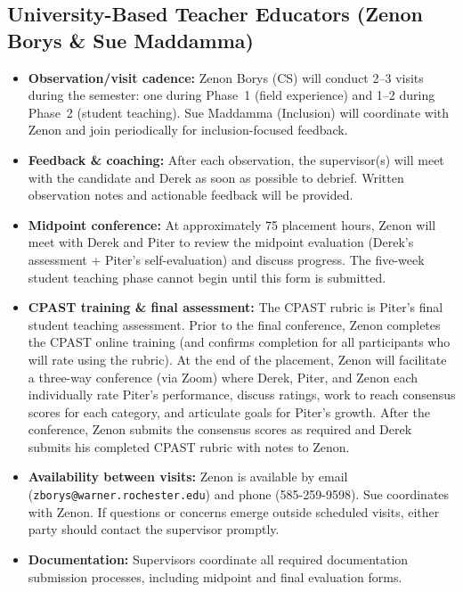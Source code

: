 \documentclass[10pt]{article}
\begin{document}
\subsection{University-Based Teacher Educators (Zenon Borys \& Sue Maddamma)}

\begin{itemize}[leftmargin=*,itemsep=0.25em]
  \item \textbf{Observation/visit cadence:} Zenon Borys (CS) will conduct 2--3 visits during the semester: one during Phase~1 (field experience) and 1--2 during Phase~2 (student teaching). Sue Maddamma (Inclusion) will coordinate with Zenon and join periodically for inclusion-focused feedback.
  \item \textbf{Feedback \& coaching:} After each observation, the supervisor(s) will meet with the candidate and Derek as soon as possible to debrief. Written observation notes and actionable feedback will be provided.
  \item \textbf{Midpoint conference:} At approximately 75 placement hours, Zenon will meet with Derek and Piter to review the midpoint evaluation (Derek's assessment + Piter's self-evaluation) and discuss progress. The five-week student teaching phase cannot begin until this form is submitted.
  \item \textbf{CPAST training \& final assessment:} The CPAST rubric is Piter's final student teaching assessment. Prior to the final conference, Zenon completes the CPAST online training (and confirms completion for all participants who will rate using the rubric). At the end of the placement, Zenon will facilitate a three-way conference (via Zoom) where Derek, Piter, and Zenon each individually rate Piter's performance, discuss ratings, work to reach consensus scores for each category, and articulate goals for Piter's growth. After the conference, Zenon submits the consensus scores as required and Derek submits his completed CPAST rubric with notes to Zenon.
  \item \textbf{Availability between visits:} Zenon is available by email (\texttt{zborys@warner.rochester.edu}) and phone (585-259-9598). Sue coordinates with Zenon. If questions or concerns emerge outside scheduled visits, either party should contact the supervisor promptly.
  \item \textbf{Documentation:} Supervisors coordinate all required documentation submission processes, including midpoint and final evaluation forms.
\end{itemize}
\end{document}

